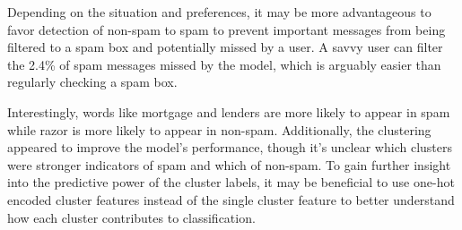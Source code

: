 \documentclass{article}      %
\begin{document}
Depending on the situation and preferences, it may be more advantageous to favor detection of non-spam to spam to prevent important messages from being filtered to a spam box and potentially missed by a user. A savvy user can filter the 2.4\% of spam messages missed by the model, which is arguably easier than regularly checking a spam box. 

Interestingly, words like mortgage and lenders are more likely to appear in spam while razor is more likely to appear in non-spam. Additionally, the clustering appeared to improve the model's performance, though it's unclear which clusters were stronger indicators of spam and which of non-spam. To gain further insight into the predictive power of the cluster labels, it may be beneficial to use one-hot encoded cluster features instead of the single cluster feature to better understand how each cluster contributes to classification.
\end{document}
